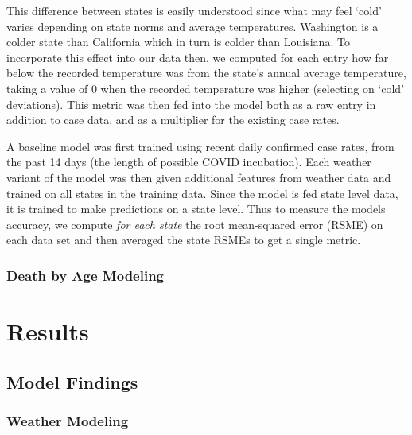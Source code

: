 \documentclass[11pt]{article}
\begin{document}
This difference between states is easily understood since what may feel `cold' varies depending on state norms and average temperatures. Washington is a colder state than California which in turn is colder than Louisiana. To incorporate this effect into our data then, we computed for each entry how far below the recorded temperature was from the state's annual average temperature, taking a value of 0 when the recorded temperature was higher (selecting on `cold' deviations). This metric was then fed into the model both as a raw entry in addition to case data, and as a multiplier for the existing case rates. 

A baseline model was first trained using recent daily confirmed case rates, from the past 14 days (the length of possible COVID incubation). 
Each weather variant of the model was then given additional features from weather data and trained on all states in the training data. Since the model is fed state level data, it is trained to make predictions on a state level. Thus to measure the models accuracy, we compute \textit{for each state} the root mean-squared error (RSME) on each data set and then averaged the state RSMEs to get a single metric. 

\subsubsection{Death by Age Modeling}

\newpage

\section{Results}

 
\subsection{Model Findings}


\subsubsection{Weather Modeling}
\end{document}
